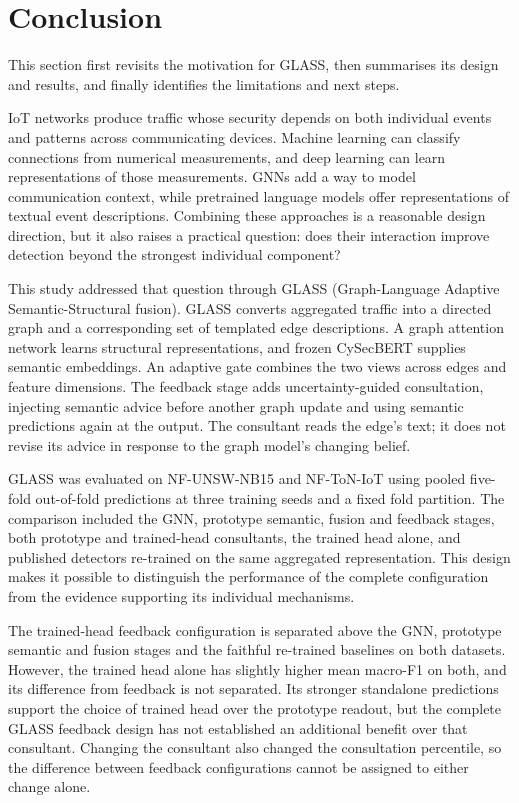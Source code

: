\section{Conclusion}
\label{sec:conclusion}

This section first revisits the motivation for GLASS, then summarises its design and results, and finally identifies the limitations and next steps.

IoT networks produce traffic whose security depends on both individual events and patterns across communicating devices. Machine learning can classify connections from numerical measurements, and deep learning can learn representations of those measurements. GNNs add a way to model communication context, while pretrained language models offer representations of textual event descriptions. Combining these approaches is a reasonable design direction, but it also raises a practical question: does their interaction improve detection beyond the strongest individual component?

This study addressed that question through GLASS (Graph-Language Adaptive Semantic-Structural fusion). GLASS converts aggregated traffic into a directed graph and a corresponding set of templated edge descriptions. A graph attention network learns structural representations, and frozen CySecBERT supplies semantic embeddings. An adaptive gate combines the two views across edges and feature dimensions. The feedback stage adds uncertainty-guided consultation, injecting semantic advice before another graph update and using semantic predictions again at the output. The consultant reads the edge's text; it does not revise its advice in response to the graph model's changing belief.

GLASS was evaluated on NF-UNSW-NB15 and NF-ToN-IoT using pooled five-fold out-of-fold predictions at three training seeds and a fixed fold partition. The comparison included the GNN, prototype semantic, fusion and feedback stages, both prototype and trained-head consultants, the trained head alone, and published detectors re-trained on the same aggregated representation. This design makes it possible to distinguish the performance of the complete configuration from the evidence supporting its individual mechanisms.

The trained-head feedback configuration is separated above the GNN, prototype semantic and fusion stages and the faithful re-trained baselines on both datasets. However, the trained head alone has slightly higher mean macro-F1 on both, and its difference from feedback is not separated. Its stronger standalone predictions support the choice of trained head over the prototype readout, but the complete GLASS feedback design has not established an additional benefit over that consultant. Changing the consultant also changed the consultation percentile, so the difference between feedback configurations cannot be assigned to either change alone.

